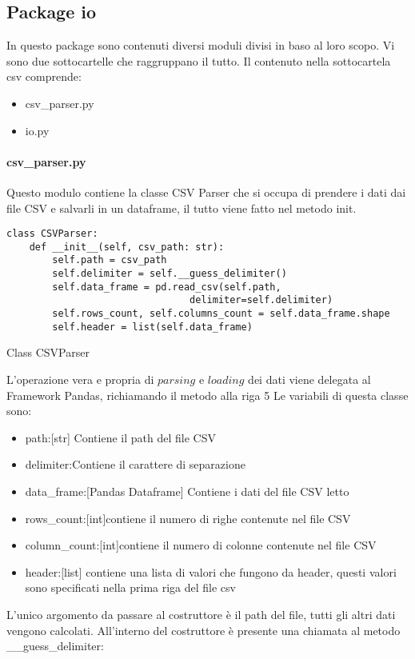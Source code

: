 \subsection{Package io}
In questo package sono contenuti diversi moduli divisi in baso al loro scopo. Vi sono due sottocartelle che raggruppano il tutto.
Il contenuto nella sottocartela csv comprende:
\begin{itemize}[noitemsep]
\let\labelitemi\labelitemii
    \item csv{\_}parser.py
    \item io.py
\end{itemize}

\paragraph{csv{\_}parser.py}
Questo modulo contiene la classe CSV Parser che si occupa di prendere i dati dai file CSV e salvarli in un dataframe, il tutto viene fatto nel metodo init.
\begin{listing}[H]
\begin{verbatim}
class CSVParser:
    def __init__(self, csv_path: str):
        self.path = csv_path
        self.delimiter = self.__guess_delimiter()
        self.data_frame = pd.read_csv(self.path, 
                                delimiter=self.delimiter)
        self.rows_count, self.columns_count = self.data_frame.shape
        self.header = list(self.data_frame)
\end{verbatim}
\caption{Class CSVParser}
\label{Code:1}
\end{listing}
L'operazione vera e propria di $parsing$ e $loading$ dei dati viene delegata al Framework Pandas, richiamando il metodo alla riga 5
Le variabili di questa classe sono:
\begin{itemize}[noitemsep]
\let\labelitemi\labelitemii
    \item path:[str] Contiene il path del file CSV
    \item delimiter:Contiene il carattere di separazione
    \item data{\_}frame:[Pandas Dataframe] Contiene i dati del file CSV letto
    \item rows{\_}count:[int]contiene il numero di righe contenute nel file CSV
    \item column{\_}count:[int]contiene il numero di colonne contenute nel file CSV
    \item header:[list] contiene una lista di valori che fungono da header, questi valori sono specificati nella prima riga del file csv
\end{itemize}
L'unico argomento da passare al costruttore è il path del file, tutti gli altri dati vengono calcolati. 
All'interno del costruttore è presente una chiamata al metodo {\_\_}guess{\_}delimiter:

